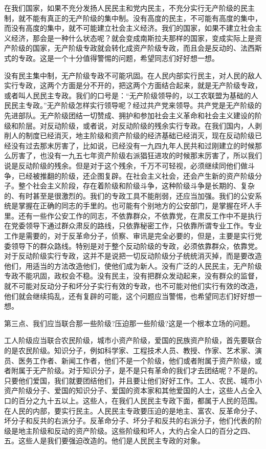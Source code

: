 在我们国家，如果不充分发扬人民民主和党内民主，不充分实行无产阶级的民主制，就不能有真正的无产阶级的集中制。没有高度的民主，不可能有高度的集中，而没有高度的集中，就不可能建立社会主义经济。我们的国家，如果不建立社会主义经济，那会是一种什么状态呢？就会变成南斯拉夫那样的国家，变成实际上是资产阶级的国家，无产阶级专政就会转化成资产阶级专政，而且会是反动的、法西斯式的专政。这是一个十分值得警惕的问题，希望同志们好好想一想。

没有民主集中制，无产阶级专政不可能巩固。在人民内部实行民主，对人民的敌人实行专政，这两个方面是分不开的，把这两个方面结合起来，就是无产阶级专政，或者叫人民民主专政。我们的口号是：“无产阶级领导的，以工农联盟为基础的人民民主专政。”无产阶级怎样实行领导呢？经过共产党来领导。共产党是无产阶级的先进部队。无产阶级团结一切赞成、拥护和参加社会主义革命和社会主义建设的阶级和阶层。对反动阶级，或者说，对反动阶级的残余实行专政。在我们国内，人剥削人的制度已经消灭，地主阶级和资产阶级的经济基础已经消灭，现在反动阶级已经没有过去那末厉害了，比如说，已经没有一九四九年人民共和过刚建立的时候那么厉害了，也没有一九五七年资产阶级右派猖狂进攻的时候那末厉害了，所以我们说是反动阶级的残余。但是对于这个残余，千万不可轻视，必须继续同他们做斗争，已经被推翻的阶级，还企图复辟。在社会主义社会，还会产生新的资产阶级分子。整个社会主义阶段，存在着阶级和阶级斗争，这种阶级斗争是长期的、复杂的、有时甚至是很激烈的。我们的专政工具不能削弱，还应当加强。我们的公安系统是掌握在正确的同志的手里的。也可能有个别地方的公安部门，是掌握在坏人手里。还有一些作公安工作的同志，不依靠群众，不依靠党，在肃反工作中不是执行在党委领导下通过群众肃反的路线，只依靠秘密工作，只依靠所谓专业工作。专业工作是需要的，对于反革命分子，侦察、审讯是完全必要的，但是，主要是实行党委领导下的群众路线。特别是对于整个反动阶级的专政，必须依靠群众，依靠党。对于反动阶级实行专政，这并不是说把一切反动阶级分子统统消灭掉，而是要改造他们，用适当的方法改造他们，使他们成为新人。没有广泛的人民民主，无产阶级专政不能巩固，政权会不稳。没有民主，没有把群众发动起来，没有群众的监督，就不可能对反动分子和坏分子实行有效的专政，也不可能对他们实行有效的改造，他们就会继续捣乱，还有复辟的可能，这个问题应当警惕，也希望同志们好好想一想。

第三点、我们应当联合那一些阶级?压迫那一些阶级?这是一个根本立场的问题。

工人阶级应当联合农民阶级，城市小资产阶级，爱国的民族资产阶级，首先要联合的是农民阶级。知识分子，例如科学家、工程技术人员、教授、作家、艺术家、演员、医务工作者、新闻工作者，他们不是一个阶级，他们或者附属于资产阶级，或者附属于无产阶级。对于知识分子，是不是只有革命的我们才去团结呢？不是的。只要他们爱国，我们就要团结他们，并且要让他们好好工作。工人、农民、城市小资产阶级分子、爱国的知识分子、爱国的资本家和其他爱国的人士，这些人占全入口的百分之九十五以上。这些人，在我们人民民主专政下面，都属于人民的范围。在人民的内部，要实行民主。人民民主专政要压迫的是地主、富农、反革命分子、坏分子和反共的右派分子。反革命分子、坏分子和反共的右派分子，他们代表的阶级是地主阶级和反动的资产阶级。这些阶级和坏人，大约占全人口的百分之四、五。这些人是我们要强迫改造的。他们是人民民主专政的对象。

